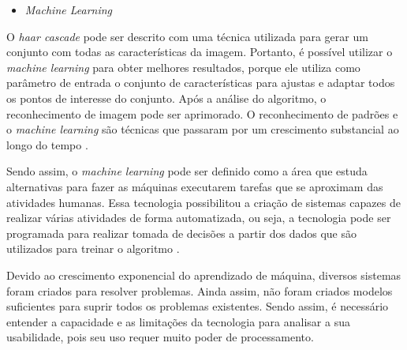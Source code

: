 \begin{itemize}
\raggedright \item \label{itm:machinelearning} \textit{Machine Learning}
\end{itemize}

O \textit{haar cascade} pode ser descrito com uma técnica utilizada para gerar um conjunto com todas as características da imagem.  Portanto, é possível utilizar o \textit{machine learning} para obter melhores resultados, porque ele utiliza como parâmetro de entrada o conjunto de características para ajustas e adaptar todos os pontos de interesse do conjunto.  Após a análise do algoritmo, o reconhecimento de imagem pode ser aprimorado. O reconhecimento de padrões e o \textit{machine learning} são técnicas que passaram por um crescimento substancial ao longo do tempo \cite{BISHOP2006}.
 
Sendo assim, o \textit{machine learning} pode ser definido como a área que estuda alternativas para fazer as máquinas executarem tarefas que se aproximam das atividades humanas. Essa tecnologia possibilitou a criação de sistemas capazes de realizar várias atividades de forma automatizada, ou seja, a tecnologia pode ser programada para realizar tomada de decisões a partir dos dados que são utilizados para treinar o algoritmo \cite{MONARD2003}.

Devido ao crescimento exponencial do aprendizado de máquina, diversos sistemas foram criados para resolver problemas. Ainda assim, não foram criados modelos suficientes para suprir todos os problemas existentes. Sendo assim, é necessário entender a capacidade e as limitações da tecnologia para analisar a sua usabilidade, pois seu uso requer muito poder de processamento.